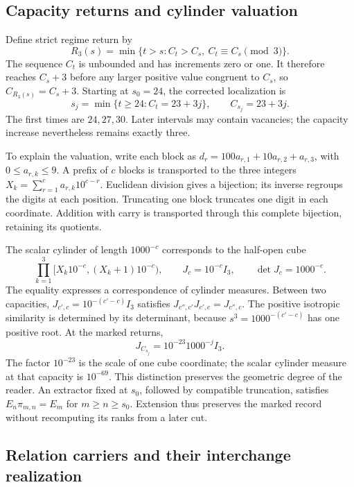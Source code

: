 \subsection{Capacity returns and cylinder valuation}
\label{sec:ii-ter27-cociclo}

Define strict regime return by
\[
 R_3(s)=\min\{t>s:C_t>C_s,\ C_t\equiv C_s\pmod3\}.
\]
The sequence $C_t$ is unbounded and has increments zero or one.
It therefore reaches $C_s+3$ before any larger positive value congruent
to $C_s$, so $C_{R_3(s)}=C_s+3$. Starting at $s_0=24$, the corrected
localization is
\begin{equation}
 s_j=\min\{t\geq24:C_t=23+3j\},\qquad C_{s_j}=23+3j.
 \label{eq:ii-ter27-localizacion}
\end{equation}
The first times are $24,27,30$. Later intervals may contain vacancies;
the capacity increase nevertheless remains exactly three.

To explain the valuation, write each block as
$d_r=100a_{r,1}+10a_{r,2}+a_{r,3}$, with $0\leq a_{r,k}\leq9$.
A prefix of $c$ blocks is transported to the three integers
$X_k=\sum_{r=1}^c a_{r,k}10^{c-r}$. Euclidean division gives a
bijection; its inverse regroups the digits at each position. Truncating
one block truncates one digit in each coordinate. Addition with carry
is transported through this complete bijection, retaining its quotients.

The scalar cylinder of length $1000^{-c}$ corresponds to the half-open cube
\[
 \prod_{k=1}^3[X_k10^{-c},(X_k+1)10^{-c}),\qquad
 J_c=10^{-c}I_3,\qquad\det J_c=1000^{-c}.
\]
The equality expresses a correspondence of cylinder measures. Between
two capacities, $J_{c',c}=10^{-(c'-c)}I_3$ satisfies
$J_{c'',c'}J_{c',c}=J_{c'',c}$. The positive isotropic similarity is
determined by its determinant, because $s^3=1000^{-(c'-c)}$ has one
positive root. At the marked returns,
\begin{equation}
 J_{C_{s_j}}=10^{-23}1000^{-j}I_3.
 \label{eq:ii-ter27-cociclo}
\end{equation}
The factor $10^{-23}$ is the scale of one cube coordinate; the scalar
cylinder measure at that capacity is $10^{-69}$. This distinction
preserves the geometric degree of the reader. An extractor fixed at
$s_0$, followed by compatible truncation, satisfies
$E_n\pi_{m,n}=E_m$ for $m\geq n\geq s_0$. Extension thus preserves
the marked record without recomputing its ranks from a later cut.

\subsection{Relation carriers and their interchange realization}
\label{sec:ii-ter27-portador}


